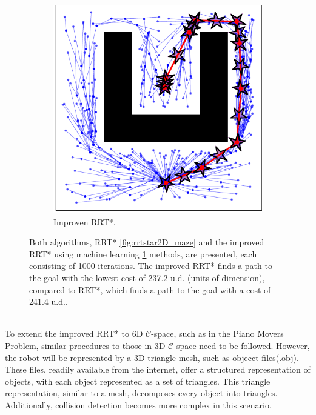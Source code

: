 \documentclass{ctuthesis}
\begin{document}
\begin{figure}[!ht]
\begin{subfigure}[b]{0.45\textwidth}
      \includegraphics[width=\textwidth]{figChap4/RRTstar2DML_maze237.2.pdf}
      \caption{Improven RRT*.}
      \label{fig:rrtstarML2D_maze}
  \end{subfigure}
  \caption{Both algorithms, 
  RRT* \ref{fig:rrtstar2D_maze} and the improved RRT* using 
  machine learning \ref{fig:rrtstarML2D_maze} methods, 
  are presented, each consisting of 1000 iterations. 
  The improved RRT* finds a path to the goal with 
  the lowest cost of 237.2 u.d. (units of dimension), compared to RRT*, 
  which finds a path to the goal with a cost of 241.4 u.d..}
  \label{fig:RRTstar2D_vs_RRTstarML2D}
\end{figure}
\\[12pt]
To extend the improved RRT* to 6D $\mathcal{C}$-space, 
such as in the Piano Movers Problem, similar procedures to those in 3D $\mathcal{C}$-space 
need to be followed. 
However, the robot will be represented by a 3D triangle mesh, such as objecct files(.obj). 
These files, readily available from the internet, 
offer a structured representation of objects, 
with each object represented as a set of triangles. 
This triangle representation, similar to a mesh, 
decomposes every object into triangles. 
Additionally, collision detection becomes more complex in this scenario. 
\end{document}
